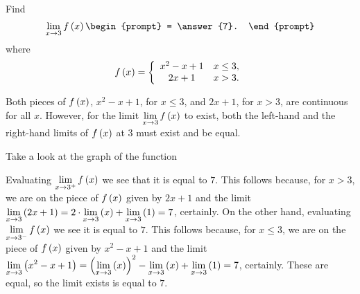 \documentclass{ximera}
\author{Gregory Hartman \and Matthew Carr}
\begin{document}
\begin{exercise}



 Find 
  \[
  \lim_{x\to 3} f\p{x}
  \begin{prompt}
  = \answer{7}.
  \end{prompt}
  \]
  where
  \[
  f\left(x\right) = \left\{\begin{array}{cl} x^2-x+1 & x\leq 3, \\ 2x+1 & x>3. \end{array}\right.
  \]
    \begin{hint}
     Both pieces of $f\left(x\right)$, $x^2-x+1$, for $x\leq3$, and $2x+1$, for $x>3$, are continuous for all $x$. However, for the limit $\lim_{x\to3}f\p{x}$ to exist, both the left-hand and the right-hand limits of $f\left(x\right)$ at $3$ must exist and be equal.
    \end{hint}
     \begin{hint}
    	Take a look at the graph of the function
    \begin{center}
      \end{center} 
    \end{hint}
    \begin{hint}
     Evaluating $\lim_{x\to3^{+}}f\p{x}$ we see that it is equal to $7$. This follows because, for $x>3$, we are on the piece of $f\left(x\right)$ given by $2x+1$ and the limit $\lim_{x\to3}\p{2x+1}=2\cdot\lim_{x\to 3}\p{x}+\lim_{x\to3}\p{1}=7$, certainly. On the other hand, evaluating $\lim_{x\to3^{-}}f\p{x}$ we see it is equal to $7$. This follows because, for $x\leq3$, we are on the piece of $f\left(x\right)$ given by $x^2-x+1$ and the limit $\lim_{x\to3}\p{x^2-x+1}=\p{\lim_{x\to3}\p{x}}^2-\lim_{x\to 3}\p{x}+\lim_{x\to3}\p{1}=7$, certainly. These are equal, so the limit exists is equal to $7$.
    \end{hint}
\end{exercise}
\end{document}
